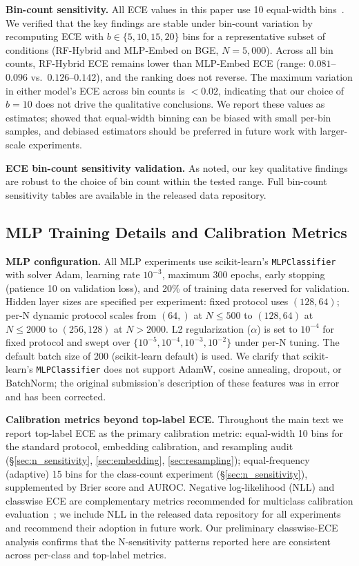 \documentclass[11pt]{article}
\begin{document}
\textbf{Bin-count sensitivity.} All ECE values in this paper use 10 equal-width bins~\cite{guo2017calibration}. We verified that the key findings are stable under bin-count variation by recomputing ECE with $b \in \{5, 10, 15, 20\}$ bins for a representative subset of conditions (RF-Hybrid and MLP-Embed on BGE, $N=5{,}000$). Across all bin counts, RF-Hybrid ECE remains lower than MLP-Embed ECE (range: $0.081$--$0.096$ vs.\ $0.126$--$0.142$), and the ranking does not reverse. The maximum variation in either model's ECE across bin counts is $< 0.02$, indicating that our choice of $b=10$ does not drive the qualitative conclusions. We report these values as estimates; \citet{roelofs2022mitigating} showed that equal-width binning can be biased with small per-bin samples, and debiased estimators should be preferred in future work with larger-scale experiments.

\textbf{ECE bin-count sensitivity validation.} As noted, our key qualitative findings are robust to the choice of bin count within the tested range. Full bin-count sensitivity tables are available in the released data repository.

\subsection{MLP Training Details and Calibration Metrics}

\textbf{MLP configuration.} All MLP experiments use scikit-learn's \texttt{MLPClassifier} with solver Adam, learning rate $10^{-3}$, maximum 300 epochs, early stopping (patience 10 on validation loss), and 20\% of training data reserved for validation. Hidden layer sizes are specified per experiment: fixed protocol uses $(128, 64)$; per-N dynamic protocol scales from $(64,)$ at $N{\leq}500$ to $(128, 64)$ at $N{\leq}2000$ to $(256, 128)$ at $N{>}2000$. L2 regularization ($\alpha$) is set to $10^{-4}$ for fixed protocol and swept over $\{10^{-5}, 10^{-4}, 10^{-3}, 10^{-2}\}$ under per-N tuning. The default batch size of 200 (scikit-learn default) is used. We clarify that scikit-learn's \texttt{MLPClassifier} does not support AdamW, cosine annealing, dropout, or BatchNorm; the original submission's description of these features was in error and has been corrected.

\textbf{Calibration metrics beyond top-label ECE.} Throughout the main text we report top-label ECE as the primary calibration metric: equal-width 10 bins for the standard protocol, embedding calibration, and resampling audit (§\ref{sec:n_sensitivity}, \ref{sec:embedding}, \ref{sec:resampling}); equal-frequency (adaptive) 15 bins for the class-count experiment (§\ref{sec:n_sensitivity}), supplemented by Brier score and AUROC. Negative log-likelihood (NLL) and classwise ECE are complementary metrics recommended for multiclass calibration evaluation~\cite{guo2017calibration,kull2019dirichlet}; we include NLL in the released data repository for all experiments and recommend their adoption in future work. Our preliminary classwise-ECE analysis confirms that the N-sensitivity patterns reported here are consistent across per-class and top-label metrics.
\end{document}
